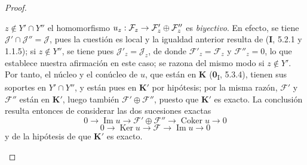 \documentclass[10pt,oneside,openany]{book}
\theoremstyle{egaenv}\newtheorem*{env}{---}
\theoremstyle{egastatement}
\theoremstyle{egadescription}
\newcommand{\oldpage}[2][]{\marginnote{\normalfont\scriptsize\textbf{#1}\,|\,#2}\ignorespaces}
\renewcommand{\to}{\mathchoice{\longrightarrow}{\rightarrow}{\rightarrow}{\rightarrow}}
\begin{document}
\begin{proof}
\begin{enumerate}
$z\notin Y'\cap Y''$ el homomorfismo
$u_z:\mathcal F_z\to\mathcal F'_z\oplus\mathcal F''_z$ es \emph{biyectivo}.
En efecto, se tiene $\mathcal J'\cap\mathcal J''=\mathcal J$, pues la cuestión es
local y
\oldpage[III]{116}
la igualdad anterior resulta de (\textbf{I}, 5.2.1 y 1.1.5); si $z\notin Y''$, se tiene
pues $\mathcal J'_z=\mathcal J_z$, de donde $\mathcal F'_z=\mathcal F_z$ y
$\mathcal F''_z=0$, lo que establece nuestra afirmación en este caso; se razona
del mismo modo si $z\notin Y'$. Por tanto, el núcleo y el conúcleo de $u$, que están
en $\boldsymbol{K}$ (\textbf{0}\textsubscript{I}, 5.3.4), tienen sus soportes en $Y'\cap Y''$,
y están pues en $\boldsymbol{K}'$ por hipótesis; por la misma razón, $\mathcal F'$ y
$\mathcal F''$ están en $\boldsymbol{K}'$, luego también $\mathcal F'\oplus\mathcal F''$,
puesto que $\boldsymbol{K}'$ es exacto. La conclusión resulta entonces de considerar las
dos sucesiones exactas
\[
0\longrightarrow\operatorname{Im}u\longrightarrow
\mathcal F'\oplus\mathcal F''\longrightarrow
\operatorname{Coker}u\longrightarrow0
\]
\[
0\longrightarrow\operatorname{Ker}u\longrightarrow\mathcal F
\longrightarrow\operatorname{Im}u\longrightarrow0
\]
y de la hipótesis de que $\boldsymbol{K}'$ es exacto.


\end{enumerate}
\end{proof}
\end{document}
